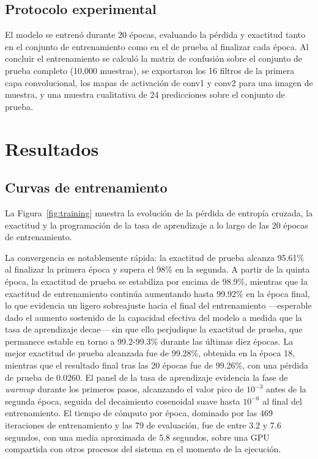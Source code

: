 \documentclass[conference]{IEEEtran}
\begin{document}
\subsection{Protocolo experimental}
El modelo se entrenó durante 20 épocas, evaluando la pérdida y exactitud tanto en el conjunto de entrenamiento como en el de prueba al finalizar cada época. Al concluir el entrenamiento se calculó la matriz de confusión sobre el conjunto de prueba completo (10{,}000 muestras), se exportaron los 16 filtros de la primera capa convolucional, los mapas de activación de conv1 y conv2 para una imagen de muestra, y una muestra cualitativa de 24 predicciones sobre el conjunto de prueba.


\section{Resultados}

\subsection{Curvas de entrenamiento}
La Figura~\ref{fig:training} muestra la evolución de la pérdida de entropía cruzada, la exactitud y la programación de la tasa de aprendizaje a lo largo de las 20 épocas de entrenamiento.

La convergencia es notablemente rápida: la exactitud de prueba alcanza 95.61\% al finalizar la primera época y supera el 98\% en la segunda. A partir de la quinta época, la exactitud de prueba se estabiliza por encima de 98.9\%, mientras que la exactitud de entrenamiento continúa aumentando hasta 99.92\% en la época final, lo que evidencia un ligero sobreajuste hacia el final del entrenamiento —esperable dado el aumento sostenido de la capacidad efectiva del modelo a medida que la tasa de aprendizaje decae— sin que ello perjudique la exactitud de prueba, que permanece estable en torno a 99.2-99.3\% durante las últimas diez épocas. La mejor exactitud de prueba alcanzada fue de 99.28\%, obtenida en la época 18, mientras que el resultado final tras las 20 épocas fue de 99.26\%, con una pérdida de prueba de 0.0260. El panel de la tasa de aprendizaje evidencia la fase de \emph{warmup} durante los primeros pasos, alcanzando el valor pico de $10^{-3}$ antes de la segunda época, seguida del decaimiento cosenoidal suave hasta $10^{-6}$ al final del entrenamiento. El tiempo de cómputo por época, dominado por las 469 iteraciones de entrenamiento y las 79 de evaluación, fue de entre 3.2 y 7.6 segundos, con una media aproximada de 5.8 segundos, sobre una GPU compartida con otros procesos del sistema en el momento de la ejecución.
\end{document}
